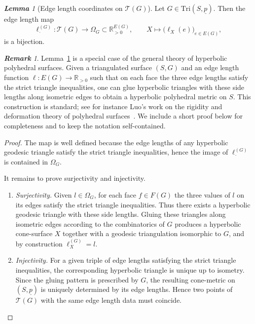 \documentclass[11pt, letterpaper]{amsart}
\theoremstyle{definition}
\theoremstyle{remark}
\newtheorem{lemma}[theorem]{\rm\bf Lemma}
\newtheorem{remark}[theorem]{\rm\bf Remark}
\newcommand{\up}{\underline{p}}
\newcommand{\Sp}{(S,\up)}
\newcommand{\TSp}{\text{Tri}\Sp}
\newcommand{\lG}{\ell^{(G)}}
\newcommand{\cT}{\mathcal{T}}
\newcommand{\bR}{\mathbb{R}}
\numberwithin{equation}{section}
\begin{document}
\begin{lemma}[Edge length coordinates on \(\cT(G)\)]
\label{lem:edge.length.Teich.biject.}
Let \(G\in\TSp\). 
Then the edge length map
\[
\lG_{\cdot}:\cT(G)\longrightarrow\Omega_G\subset\bR^{E(G)}_{>0},\qquad
X\longmapsto\big(\ell_X(e)\big)_{e\in E(G)},
\]
is a bijection.
\end{lemma}

\begin{remark}
Lemma~\ref{lem:edge.length.Teich.biject.} is a special case of the general
theory of hyperbolic polyhedral surfaces.
Given a triangulated surface \((S,G)\) and an edge length function
\(\ell:E(G)\to\bR_{>0}\) such that on each face the three edge lengths satisfy
the strict triangle inequalities, one can glue hyperbolic triangles with
these side lengths along isometric edges to obtain a hyperbolic polyhedral
metric on \(S\).
This construction is standard; see for instance Luo's work on the rigidity and
deformation theory of polyhedral surfaces~\cite{Luo14,Luo11}.
We include a short proof below for completeness and to keep the notation
self-contained.
\end{remark}

\begin{proof}
The map is well defined because the edge lengths of any hyperbolic geodesic
triangle satisfy the strict triangle inequalities, hence the image of
\(\lG_{\cdot}\) is contained in \(\Omega_G\).

It remains to prove surjectivity and injectivity.

\begin{enumerate}
\item \emph{Surjectivity.}
Given \(l\in\Omega_G\), for each face \(f\in F(G)\) the three values of \(l\) on
its edges satisfy the strict triangle inequalities.
Thus there exists a hyperbolic geodesic triangle with these side lengths.
Gluing these triangles along isometric edges according to the combinatorics of
\(G\) produces a hyperbolic cone-surface \(X\) together with a geodesic
triangulation isomorphic to \(G\), and by construction \(\lG_X=l\).

\item \emph{Injectivity.}
For a given triple of edge lengths satisfying the strict triangle inequalities,
the corresponding hyperbolic triangle is unique up to isometry.
Since the gluing pattern is prescribed by \(G\), the resulting cone-metric on
\(\Sp\) is uniquely determined by its edge lengths.
Hence two points of \(\cT(G)\) with the same edge length data must coincide.
\end{enumerate}
\end{proof}
\end{document}
